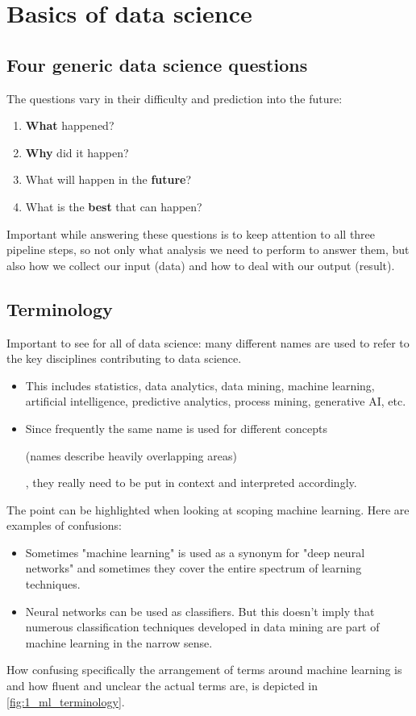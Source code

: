 \section{Basics of data science}
\setcounter{figure}{0}




\subsection*{Four generic data science questions}
The questions vary in their difficulty and prediction into the future:
\begin{enumerate}
  \item \textbf{What} happened?
  \item \textbf{Why} did it happen?
  \item What will happen in the \textbf{future}?
  \item What is the \textbf{best} that can happen?
\end{enumerate}

Important while answering these questions is to keep attention to all three pipeline steps, so not only what analysis we need to perform to answer them, but also how we collect our input (data) and how to deal with our output (result).







\subsection*{Terminology}
Important to see for all of data science: many different names are used to refer to the key disciplines contributing to data science.
\begin{itemize}
  \item This includes statistics, data analytics, data mining, machine learning, artificial intelligence, predictive analytics, process mining, generative AI, etc.
  \item Since frequently the same name is used for different concepts \begin{note}(names describe heavily overlapping areas)\end{note}, they really need to be put in context and interpreted accordingly.
\end{itemize}

The point can be highlighted when looking at scoping machine learning. Here are examples of confusions:
\begin{itemize}
  \item Sometimes "machine learning" is used as a synonym for "deep neural networks" and sometimes they cover the entire spectrum of learning techniques.
  \item Neural networks can be used as classifiers. But this doesn't imply that numerous classification techniques developed in data mining are part of machine learning in the narrow sense.
\end{itemize}
How confusing specifically the arrangement of terms around machine learning is and how fluent and unclear the actual terms are, is depicted in \ref{fig:1_ml_terminology}.

